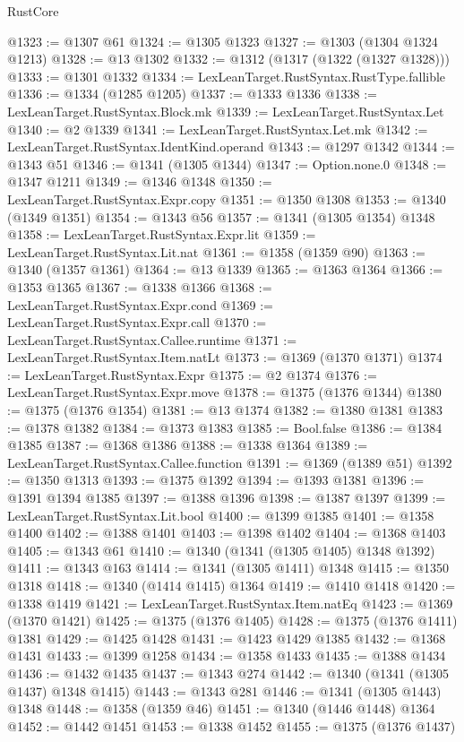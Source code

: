 \begin{lexlean}{RustCore}
\begin{coremodule}
@1323 := @1307 @61
@1324 := @1305 @1323
@1327 := @1303 (@1304 @1324 @1213)
@1328 := @13 @1302
@1332 := @1312 (@1317 (@1322 (@1327 @1328)))
@1333 := @1301 @1332
@1334 := LexLeanTarget.RustSyntax.RustType.fallible
@1336 := @1334 (@1285 @1205)
@1337 := @1333 @1336
@1338 := LexLeanTarget.RustSyntax.Block.mk
@1339 := LexLeanTarget.RustSyntax.Let
@1340 := @2 @1339
@1341 := LexLeanTarget.RustSyntax.Let.mk
@1342 := LexLeanTarget.RustSyntax.IdentKind.operand
@1343 := @1297 @1342
@1344 := @1343 @51
@1346 := @1341 (@1305 @1344)
@1347 := Option.none.{0}
@1348 := @1347 @1211
@1349 := @1346 @1348
@1350 := LexLeanTarget.RustSyntax.Expr.copy
@1351 := @1350 @1308
@1353 := @1340 (@1349 @1351)
@1354 := @1343 @56
@1357 := @1341 (@1305 @1354) @1348
@1358 := LexLeanTarget.RustSyntax.Expr.lit
@1359 := LexLeanTarget.RustSyntax.Lit.nat
@1361 := @1358 (@1359 @90)
@1363 := @1340 (@1357 @1361)
@1364 := @13 @1339
@1365 := @1363 @1364
@1366 := @1353 @1365
@1367 := @1338 @1366
@1368 := LexLeanTarget.RustSyntax.Expr.cond
@1369 := LexLeanTarget.RustSyntax.Expr.call
@1370 := LexLeanTarget.RustSyntax.Callee.runtime
@1371 := LexLeanTarget.RustSyntax.Item.natLt
@1373 := @1369 (@1370 @1371)
@1374 := LexLeanTarget.RustSyntax.Expr
@1375 := @2 @1374
@1376 := LexLeanTarget.RustSyntax.Expr.move
@1378 := @1375 (@1376 @1344)
@1380 := @1375 (@1376 @1354)
@1381 := @13 @1374
@1382 := @1380 @1381
@1383 := @1378 @1382
@1384 := @1373 @1383
@1385 := Bool.false
@1386 := @1384 @1385
@1387 := @1368 @1386
@1388 := @1338 @1364
@1389 := LexLeanTarget.RustSyntax.Callee.function
@1391 := @1369 (@1389 @51)
@1392 := @1350 @1313
@1393 := @1375 @1392
@1394 := @1393 @1381
@1396 := @1391 @1394 @1385
@1397 := @1388 @1396
@1398 := @1387 @1397
@1399 := LexLeanTarget.RustSyntax.Lit.bool
@1400 := @1399 @1385
@1401 := @1358 @1400
@1402 := @1388 @1401
@1403 := @1398 @1402
@1404 := @1368 @1403
@1405 := @1343 @61
@1410 := @1340 (@1341 (@1305 @1405) @1348 @1392)
@1411 := @1343 @163
@1414 := @1341 (@1305 @1411) @1348
@1415 := @1350 @1318
@1418 := @1340 (@1414 @1415) @1364
@1419 := @1410 @1418
@1420 := @1338 @1419
@1421 := LexLeanTarget.RustSyntax.Item.natEq
@1423 := @1369 (@1370 @1421)
@1425 := @1375 (@1376 @1405)
@1428 := @1375 (@1376 @1411) @1381
@1429 := @1425 @1428
@1431 := @1423 @1429 @1385
@1432 := @1368 @1431
@1433 := @1399 @1258
@1434 := @1358 @1433
@1435 := @1388 @1434
@1436 := @1432 @1435
@1437 := @1343 @274
@1442 := @1340 (@1341 (@1305 @1437) @1348 @1415)
@1443 := @1343 @281
@1446 := @1341 (@1305 @1443) @1348
@1448 := @1358 (@1359 @46)
@1451 := @1340 (@1446 @1448) @1364
@1452 := @1442 @1451
@1453 := @1338 @1452
@1455 := @1375 (@1376 @1437)

\end{coremodule}
\end{lexlean}
